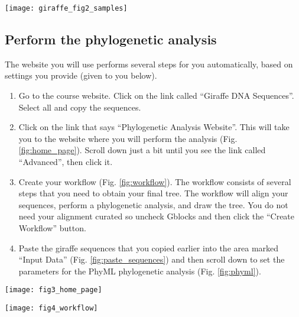 \documentclass[11pt, addpoints]{exam}
\begin{document}
\begin{center}
	\texttt{[image: giraffe\_fig2\_samples]}
\end{center}

\subsection*{Perform the phylogenetic analysis}

The website you will use performs several steps for you automatically,
based on settings you provide (given to you below).

\begin{enumerate}
\item
  Go to the course website. Click on the link called ``Giraffe DNA
  Sequences''. Select all and copy the sequences.
\item
  Click on the link that says ``Phylogenetic Analysis Website''. This
  will take you to the website where you will perform the analysis (Fig.
  \ref{fig:home_page}). Scroll down just a bit until you see the link called ``Advanced'',
  then click it.
\item Create your workflow (Fig. \ref{fig:workflow}). The workflow consists of several steps
  that you need to obtain your final tree. The workflow will align your
  sequences,  perform a phylogenetic analysis, and draw the
  tree. You do not need your alignment curated so uncheck Gblocks and
  then click the ``Create Workflow'' button.
\item
  Paste the giraffe sequences that you copied earlier into the area
  marked ``Input Data'' (Fig. \ref{fig:paste_sequences}) and then scroll down to set the
  parameters for the PhyML phylogenetic analysis (Fig. \ref{fig:phyml}).
\end{enumerate}

\begin{center}
	\texttt{[image: fig3\_home\_page]}
\end{center}


\begin{center}
	\texttt{[image: fig4\_workflow]}
\end{center}
\end{document}

